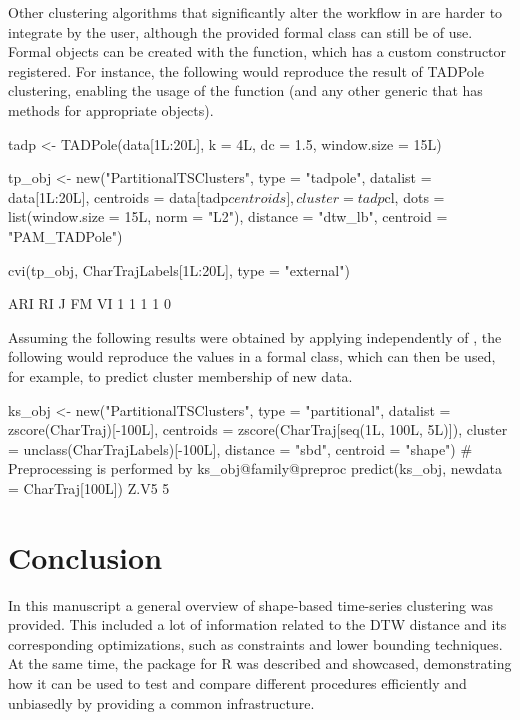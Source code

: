 Other clustering algorithms that significantly alter the workflow in \dtwclust{} are harder to integrate by the user,
although the provided formal class can still be of use.
Formal objects can be created with the  function,
which has a custom constructor registered.
For instance, the following would reproduce the result of TADPole clustering,
enabling the usage of the  function
(and any other generic that has methods for appropriate  objects).

\begin{example}
tadp <- TADPole(data[1L:20L], k = 4L, dc = 1.5, window.size = 15L)

tp_obj <- new("PartitionalTSClusters",
              type = "tadpole",
              datalist = data[1L:20L],
              centroids = data[tadp$centroids],
              cluster = tadp$cl,
              dots = list(window.size = 15L,
                          norm = "L2"),
              distance = "dtw_lb",
              centroid = "PAM_TADPole")

cvi(tp_obj, CharTrajLabels[1L:20L], type = "external")

ARI  RI   J  FM  VI
1   1   1   1   0
\end{example}

Assuming the following results were obtained by applying \kshape{} independently of \dtwclust{},
the following would reproduce the values in a formal class,
which can then be used,
for example,
to predict cluster membership of new data.

\begin{example}
ks_obj <- new("PartitionalTSClusters",
              type = "partitional",
              datalist = zscore(CharTraj)[-100L],
              centroids = zscore(CharTraj[seq(1L, 100L, 5L)]),
              cluster = unclass(CharTrajLabels)[-100L],
              distance = "sbd",
              centroid = "shape")
# Preprocessing is performed by ks_obj@family@preproc
predict(ks_obj, newdata = CharTraj[100L])
Z.V5
5
\end{example}

\section{Conclusion}
\label{sec:conclusion}

In this manuscript a general overview of shape-based time-series clustering was provided.
This included a lot of information related to the DTW distance and its corresponding optimizations,
such as constraints and lower bounding techniques.
At the same time, the \dtwclust{} package for R was described and showcased,
demonstrating how it can be used to test and compare different procedures efficiently and unbiasedly by providing a common infrastructure.


